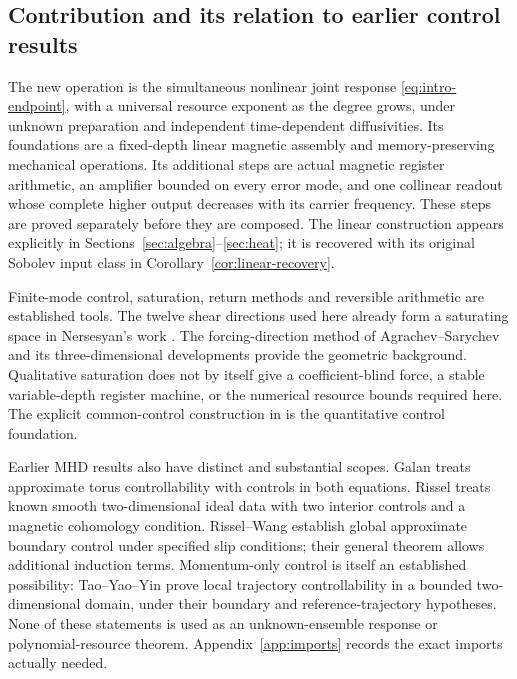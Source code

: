\documentclass[11pt,a4paper]{amsart}
\theoremstyle{definition}
\theoremstyle{remark}
\numberwithin{equation}{section}
\begin{document}
\subsection{Contribution and its relation to earlier control results}
The new operation is the simultaneous nonlinear joint response
\eqref{eq:intro-endpoint}, with a universal resource exponent as the degree
grows, under unknown preparation and independent time-dependent diffusivities.
Its foundations are a fixed-depth linear magnetic assembly and memory-preserving
mechanical operations. Its additional steps are actual magnetic register
arithmetic, an amplifier bounded on every error mode, and one collinear
readout whose complete higher output decreases with its carrier frequency.
These steps are proved separately before they are composed. The linear
construction appears explicitly in Sections~\ref{sec:algebra}--\ref{sec:heat};
it is recovered with its original Sobolev input class in
Corollary~\ref{cor:linear-recovery}.

Finite-mode control, saturation, return methods and reversible arithmetic
are established tools. The twelve shear directions used here already form a
saturating space in Nersesyan's work
\cite[Theorem~4.1 and Proposition~4.3]{Nersesyan2015}.
The forcing-direction method of Agrachev--Sarychev \cite{AS2005} and its
three-dimensional developments \cite{Shirikyan2006,Nersesyan2015,Nersesyan21}
provide the geometric background. Qualitative saturation does not by itself
give a coefficient-blind force, a stable variable-depth register machine, or
the numerical resource bounds required here. The explicit common-control
construction in \cite{Common} is the quantitative control foundation.

Earlier MHD results also have distinct and substantial scopes. Galan
\cite[Theorem~2.1]{Galan2011} treats approximate torus controllability with
controls in both equations. Rissel \cite[Theorem~1.2]{Rissel} treats known
smooth two-dimensional ideal data with two interior controls and a magnetic
cohomology condition. Rissel--Wang \cite[Theorems~1.2 and~1.5]{RisselWang}
establish global approximate boundary control under specified slip conditions;
their general theorem allows additional induction terms. Momentum-only
control is itself an established possibility: Tao--Yao--Yin \cite{TaoYaoYin}
prove local trajectory controllability in a bounded two-dimensional domain,
under their boundary and reference-trajectory hypotheses. None of these
statements is used as an unknown-ensemble response or polynomial-resource
theorem. Appendix~\ref{app:imports} records the exact imports actually needed.
\end{document}
